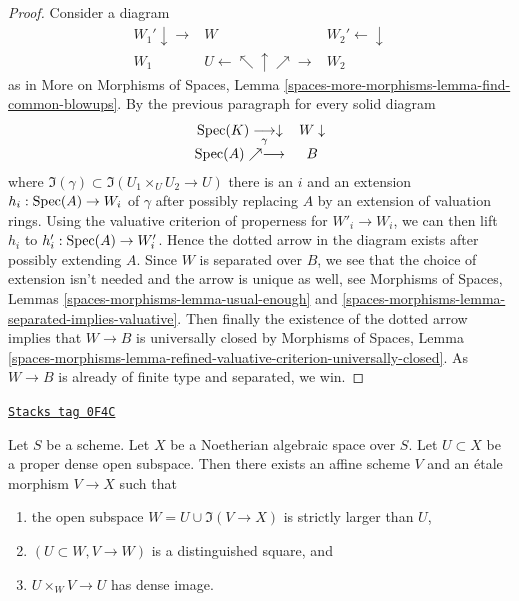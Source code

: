 \begin{proof}
\medskip\noindent
Consider a diagram
$$
\begin{array}{ccc}W_1' \downarrow\longrightarrow & W & W_2' \longleftarrow\downarrow \\ W_1 & U \longleftarrow\nwarrow\uparrow\nearrow\longrightarrow & W_2\end{array}
$$
as in More on Morphisms of Spaces, Lemma
\ref{spaces-more-morphisms-lemma-find-common-blowups}.
By the previous paragraph for every solid diagram
$$
\begin{array}{cc}\operatorname{Spec}(K) \underset{\gamma}{\longrightarrow}\downarrow & W \downarrow \\ \operatorname{Spec}(A) \nearrow\longrightarrow & B\end{array}
$$
where $\Im(\gamma) \subset \Im(U_1 \times_U U_2 \to U)$
there is an $i$ and an extension $h_i : \operatorname{Spec}(A) \to W_i$ of $\gamma$
after possibly replacing $A$ by an extension of valuation rings.
Using the valuative criterion of properness for $W'_i \to W_i$,
we can then lift $h_i$ to $h'_i : \operatorname{Spec}(A) \to W'_i$.
Hence the dotted arrow in the diagram exists after possibly
extending $A$. Since $W$ is separated over $B$, we see that the choice
of extension isn't needed and the arrow is unique as well, see
Morphisms of Spaces, Lemmas \ref{spaces-morphisms-lemma-usual-enough}
and \ref{spaces-morphisms-lemma-separated-implies-valuative}.
Then finally the existence of the dotted arrow
implies that $W \to B$ is universally closed by
Morphisms of Spaces, Lemma
\ref{spaces-morphisms-lemma-refined-valuative-criterion-universally-closed}.
As $W \to B$ is already of finite type and separated, we win.
\end{proof}

\begin{lemma}
\label{spaces-pushouts-lemma-filter-Noetherian-space}
\href{https://stacks.math.columbia.edu/tag/0F4C}{\texttt{Stacks tag 0F4C}}

Let $S$ be a scheme. Let $X$ be a Noetherian algebraic space over $S$.
Let $U \subset X$ be a proper dense open subspace. Then there exists an
affine scheme $V$ and an \'etale morphism $V \to X$ such that
\begin{enumerate}
\item the open subspace $W = U \cup \Im(V \to X)$ is strictly larger
than $U$,
\item $(U \subset W, V \to W)$ is a distinguished square, and
\item $U \times_W V \to U$ has dense image.
\end{enumerate}
\end{lemma}

